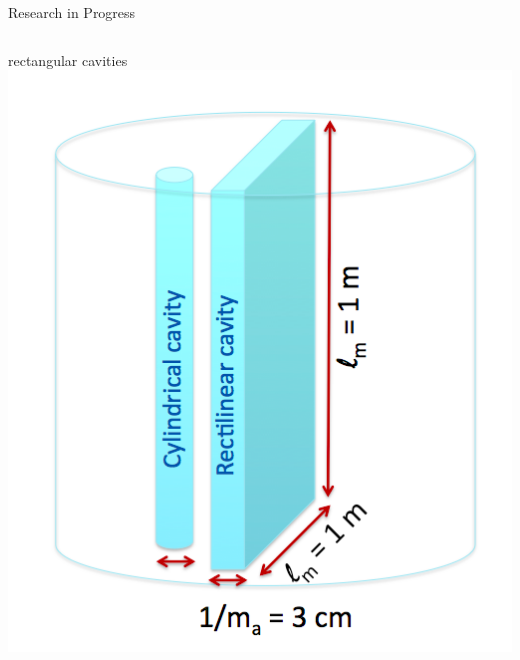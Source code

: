 \documentclass{beamer}
\begin{document}
\begin{frame}{Research in Progress}
\begin{columns}
{\tiny rectangular cavities}
\includegraphics[width=.8\textwidth]{rectangular_cavity}



\end{columns}
\end{frame}

%
%
%
%
%
%
%
\end{document}
